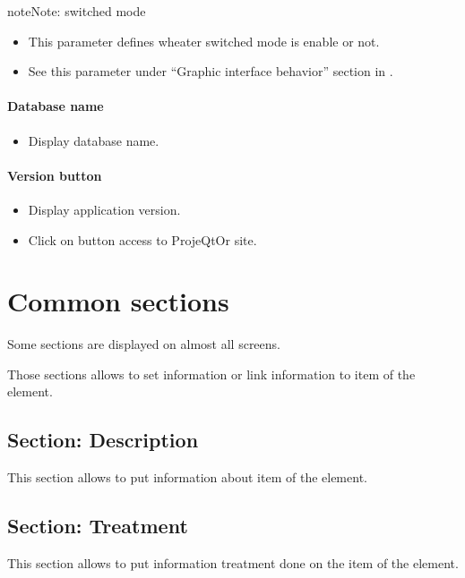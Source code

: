 \documentclass[letterpaper,10pt,english]{sphinxmanual}
\begin{document}
\begin{notice}{note}{Note:}
switched mode
\begin{itemize}
\item {} 
This parameter defines wheater switched mode is enable or not.

\item {} 
See this parameter under ``Graphic interface behavior'' section in {\hyperref[UserParameter:user-parameters-label]{\emph{}}}.

\end{itemize}
\end{notice}
\paragraph{Database name}
\begin{itemize}
\item {} 
Display database name.

\end{itemize}
\paragraph{Version button}
\begin{itemize}
\item {} 
Display application version.

\item {} 
Click on button access to ProjeQtOr site.

\end{itemize}
\newpage

\section{Common sections}
\label{Gui:gui-sections-label}\label{Gui:common-sections}
Some sections are displayed on almost all screens.

Those sections allows to set information or link information to item of the element.


\subsection{Section: Description}
\label{Gui:section-description}
This section allows to put information about item of the element.


\subsection{Section: Treatment}
\label{Gui:section-treatment}
This section allows to put information treatment done on the item of the element.
\end{document}

